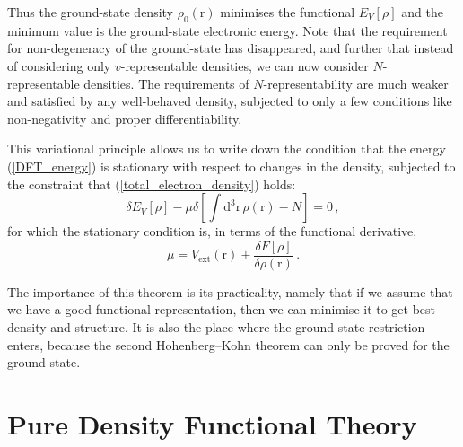 \documentclass{article}
\theoremstyle{plain}\theoremheaderfont{\normalfont\itshape}\theorembodyfont{\rmfamily}\theoremseparator{.}\newtheorem*{rem}{Remark}\newtheorem*{ex}{Example}\newtheorem*{proof}{Proof}\newtheorem*{altp}{Alternative proof}
\theoremstyle{plain}\theoremheaderfont{\normalfont\bfseries}\theorembodyfont{\rmfamily}\theoremseparator{.}\newtheorem{thm}{Theorem}[section]\newtheorem{lem}[thm]{Lemma}\newtheorem{prop}[thm]{Proposition}\newtheorem*{cor}{Corollary}\newtheorem{defn}[thm]{Definition}\newtheorem{clm}[thm]{Claim}\newtheorem{clminproof}{Claim}
\theoremstyle{break}\theoremheaderfont{\normalfont\itshape}\theorembodyfont{\rmfamily}\theoremseparator{.\medskip}\newtheorem*{proofskip}{Proof}\newtheorem*{exs}{Examples}\newtheorem*{rems}{Remarks}
\theoremstyle{break}\theoremheaderfont{\normalfont\bfseries}\theorembodyfont{\rmfamily}\theoremseparator{.\medskip}\newtheorem{lemskip}[thm]{Lemma}\newtheorem{defnskip}[thm]{Definition}\newtheorem{propskip}[thm]{Proposition}\newtheorem{thmskip}[thm]{Theorem}
\numberwithin{equation}{section}
\newcommand{\dd}[2][]{\mathrm{d}^{#1} #2\,}
\newcommand{\vb}[1]{\bm{\mathrm{#1}}}
\newcommand{\ext}{_{\text{ext}}}
\begin{document}
    Thus the ground-state density \(\rho_0(\vb{r})\) minimises the functional \(E_V[\rho]\) and the minimum value is the ground-state electronic energy. Note that the requirement for non-degeneracy of the ground-state has disappeared, and further that instead of considering only \(v\)-representable densities, we can now consider \(N\)-representable densities. The requirements of \(N\)-representability are much weaker and satisfied by any well-behaved density, subjected to only a few conditions like non-negativity and proper differentiability.

    This variational principle allows us to write down the condition that the energy (\ref{DFT_energy}) is stationary with respect to changes in the density, subjected to the constraint that (\ref{total_electron_density}) holds:
    \begin{equation}
        \delta E_V[\rho]-\mu\delta\left[\int\dd[3]{\vb{r}}\rho(\vb{r})-N\right]=0\,,
    \end{equation}
    for which the stationary condition is, in terms of the functional derivative,
    \begin{equation}
        \mu=V\ext(\vb{r})+\frac{\delta F[\rho]}{\delta\rho(\vb{r})}\,.
    \end{equation}

    The importance of this theorem is its practicality, namely that if we assume that we have a good functional representation, then we can minimise it to get best density and structure. It is also the place where the ground state restriction enters, because the second Hohenberg--Kohn theorem can only be proved for the ground state.

    \newpage
    \section{Pure Density Functional Theory}
\end{document}
